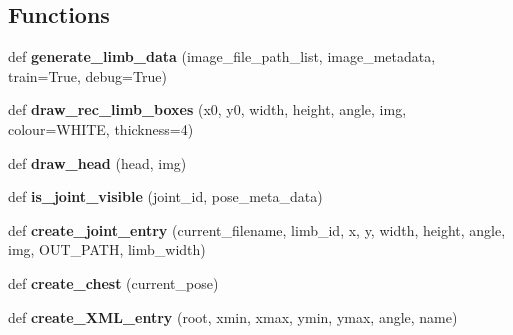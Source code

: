 \subsection*{Functions}
\begin{DoxyCompactItemize}
\item 
\mbox{\label{namespacesrc_1_1busniess_1_1generate__limb__bbox__darkflow_a4087ec0a81b85a74384528631c085b8e}} 
def {\bfseries generate\+\_\+limb\+\_\+data} (image\+\_\+file\+\_\+path\+\_\+list, image\+\_\+metadata, train=True, debug=True)
\item 
\mbox{\label{namespacesrc_1_1busniess_1_1generate__limb__bbox__darkflow_a9f40917be4a9b3724633d1143a0b3237}} 
def {\bfseries draw\+\_\+rec\+\_\+limb\+\_\+boxes} (x0, y0, width, height, angle, img, colour=W\+H\+I\+TE, thickness=4)
\item 
\mbox{\label{namespacesrc_1_1busniess_1_1generate__limb__bbox__darkflow_afd7a5a78d4fa4ed18a2e2cfd96c38466}} 
def {\bfseries draw\+\_\+head} (head, img)
\item 
\mbox{\label{namespacesrc_1_1busniess_1_1generate__limb__bbox__darkflow_a19003ae8330279750358703ad352a510}} 
def {\bfseries is\+\_\+joint\+\_\+visible} (joint\+\_\+id, pose\+\_\+meta\+\_\+data)
\item 
\mbox{\label{namespacesrc_1_1busniess_1_1generate__limb__bbox__darkflow_af40581e70383fc9c23763c5fff507bde}} 
def {\bfseries create\+\_\+joint\+\_\+entry} (current\+\_\+filename, limb\+\_\+id, x, y, width, height, angle, img, O\+U\+T\+\_\+\+P\+A\+TH, limb\+\_\+width)
\item 
\mbox{\label{namespacesrc_1_1busniess_1_1generate__limb__bbox__darkflow_adf14908c22d918a20375bfadbad6e783}} 
def {\bfseries create\+\_\+chest} (current\+\_\+pose)
\item 
\mbox{\label{namespacesrc_1_1busniess_1_1generate__limb__bbox__darkflow_aaaf2d7d4639c5239011cdee7069da46f}} 
def {\bfseries create\+\_\+\+X\+M\+L\+\_\+entry} (root, xmin, xmax, ymin, ymax, angle, name)
\end{DoxyCompactItemize}
